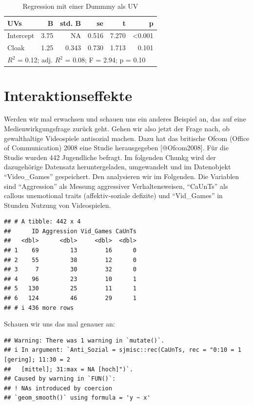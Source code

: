 \documentclass[
  10pt,
  letterpaper,
  a4paper, twoside]{scrreprt}
\begin{document}
\begin{table}
\caption{Regression mit einer Dummmy als UV}\tabularnewline

\centering\begingroup\fontsize{10}{12}\selectfont

\begin{tabular}{l|r|r|r|r|r}
\hline
UVs & B & std. B & se & t & p\\
\hline
Intercept & 3.75 & NA & 0.516 & 7.270 & <0.001\\
\hline
Cloak & 1.25 & 0.343 & 0.730 & 1.713 & 0.101\\
\hline
\multicolumn{6}{l}{\rule{0pt}{1em}$R^2$ = 0.12; adj. $R^2$ = 0.08; F = 2.94; p = 0.10}\\
\end{tabular}
\endgroup{}
\end{table}

\section{Interaktionseffekte}\label{interaktionseffekte}

Werden wir mal erwachsen und schauen uns ein anderes Beispiel an, das
auf eine Medienwirkgungsfrage zurück geht. Gehen wir also jetzt der
Frage nach, ob gewalthaltige Videospiele antisozial machen. Dazu hat das
britische Ofcom (Office of Communication) 2008 eine Studie herausgegeben
{[}@Ofcom2008{]}. Für die Studie wurden 442 Jugendliche befragt. Im
folgenden Chunkg wird der dazugehörige Datensatz heruntergeladen,
umgewandelt und im Datenobjekt \enquote{Video\_Games} gespeichert. Den
analysieren wir im Folgenden. Die Variablen sind \enquote{Aggression}
als Messung aggressiver Verhaltensweisen, \enquote{CaUnTs} als callous
unemotional traits (affektiv-soziale defizite) und \enquote{Vid\_Games}
in Stunden Nutzung von Videospielen.

\begin{verbatim}
## # A tibble: 442 x 4
##      ID Aggression Vid_Games CaUnTs
##   <dbl>      <dbl>     <dbl>  <dbl>
## 1    69         13        16      0
## 2    55         38        12      0
## 3     7         30        32      0
## 4    96         23        10      1
## 5   130         25        11      1
## 6   124         46        29      1
## # i 436 more rows
\end{verbatim}

Schauen wir uns das mal genauer an:

\begin{verbatim}
## Warning: There was 1 warning in `mutate()`.
## i In argument: `Anti_Sozial = sjmisc::rec(CaUnTs, rec = "0:10 = 1 [gering]; 11:30 = 2
##   [mittel]; 31:max = NA [hoch]")`.
## Caused by warning in `FUN()`:
## ! NAs introduced by coercion
## `geom_smooth()` using formula = 'y ~ x'
\end{verbatim}
\end{document}
